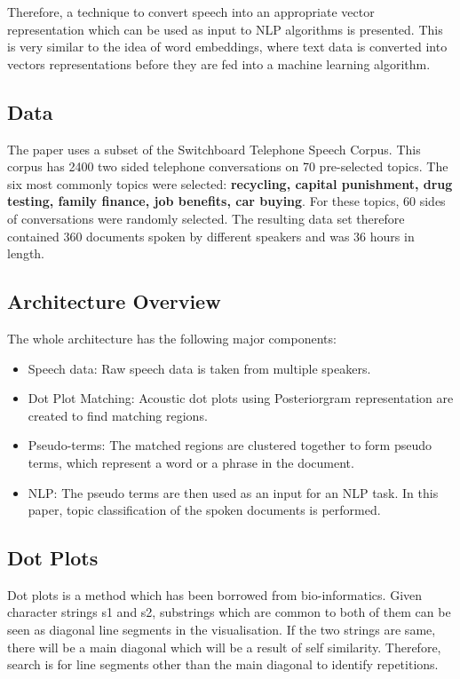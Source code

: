\documentclass[a4paper]{article}
\begin{document}
Therefore, a technique to convert speech into an appropriate vector representation which can be used as input to NLP algorithms is presented. This is very similar to the idea of word embeddings, where text data is converted into vectors representations before they are fed into a machine learning algorithm.

\subsection{Data}
The paper uses a subset of the Switchboard Telephone Speech Corpus. This corpus has 2400 two sided telephone conversations on 70 pre-selected topics. The six most commonly topics were selected: \textbf{recycling, capital punishment, drug testing, family finance, job benefits, car buying}. For these topics, 60 sides of conversations were randomly selected. The resulting data set therefore contained 360 documents spoken by different speakers and was 36 hours in length.


\subsection{Architecture Overview}
The whole architecture has the following major components:

\begin{itemize}
\item Speech data: Raw speech data is taken from multiple speakers.
\item Dot Plot Matching: Acoustic dot plots using Posteriorgram representation are created to find matching regions.
\item Pseudo-terms: The matched regions are clustered together to form pseudo terms, which represent a word or a phrase in the document.
\item NLP: The pseudo terms are then used as an input for an NLP task. In this paper, topic classification of the spoken documents is performed.
\end{itemize}

\subsection{Dot Plots}
Dot plots is a method which has been borrowed from bio-informatics. Given character strings s1 and s2, substrings which are common to both of them can be seen as diagonal line segments in the visualisation. If the two strings are same, there will be a main diagonal which will be a result of self similarity. Therefore, search is for line segments other than the main diagonal to identify repetitions.
\end{document}
